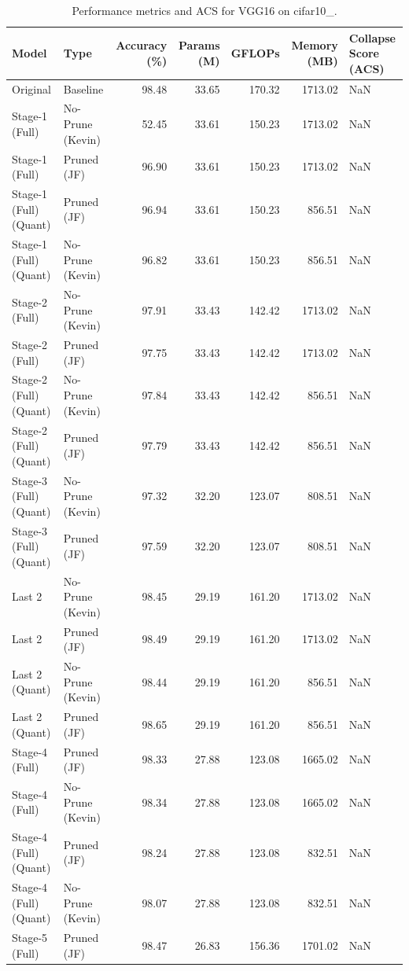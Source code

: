 \begin{table}
\caption{Performance metrics and ACS for VGG16 on cifar10_.}
\label{tab:VGG16_cifar10_}
\begin{tabular}{llrrrrl}
\toprule
Model & Type & Accuracy (\%) & Params (M) & GFLOPs & Memory (MB) & Collapse Score (ACS) \\
\midrule
Original & Baseline & 98.48 & 33.65 & 170.32 & 1713.02 & NaN \\
Stage-1 (Full) & No-Prune (Kevin) & 52.45 & 33.61 & 150.23 & 1713.02 & NaN \\
Stage-1 (Full) & Pruned (JF) & 96.90 & 33.61 & 150.23 & 1713.02 & NaN \\
Stage-1 (Full)
(Quant) & Pruned (JF) & 96.94 & 33.61 & 150.23 & 856.51 & NaN \\
Stage-1 (Full)
(Quant) & No-Prune (Kevin) & 96.82 & 33.61 & 150.23 & 856.51 & NaN \\
Stage-2 (Full) & No-Prune (Kevin) & 97.91 & 33.43 & 142.42 & 1713.02 & NaN \\
Stage-2 (Full) & Pruned (JF) & 97.75 & 33.43 & 142.42 & 1713.02 & NaN \\
Stage-2 (Full)
(Quant) & No-Prune (Kevin) & 97.84 & 33.43 & 142.42 & 856.51 & NaN \\
Stage-2 (Full)
(Quant) & Pruned (JF) & 97.79 & 33.43 & 142.42 & 856.51 & NaN \\
Stage-3 (Full)
(Quant) & No-Prune (Kevin) & 97.32 & 32.20 & 123.07 & 808.51 & NaN \\
Stage-3 (Full)
(Quant) & Pruned (JF) & 97.59 & 32.20 & 123.07 & 808.51 & NaN \\
Last 2 & No-Prune (Kevin) & 98.45 & 29.19 & 161.20 & 1713.02 & NaN \\
Last 2 & Pruned (JF) & 98.49 & 29.19 & 161.20 & 1713.02 & NaN \\
Last 2
(Quant) & No-Prune (Kevin) & 98.44 & 29.19 & 161.20 & 856.51 & NaN \\
Last 2
(Quant) & Pruned (JF) & 98.65 & 29.19 & 161.20 & 856.51 & NaN \\
Stage-4 (Full) & Pruned (JF) & 98.33 & 27.88 & 123.08 & 1665.02 & NaN \\
Stage-4 (Full) & No-Prune (Kevin) & 98.34 & 27.88 & 123.08 & 1665.02 & NaN \\
Stage-4 (Full)
(Quant) & Pruned (JF) & 98.24 & 27.88 & 123.08 & 832.51 & NaN \\
Stage-4 (Full)
(Quant) & No-Prune (Kevin) & 98.07 & 27.88 & 123.08 & 832.51 & NaN \\
Stage-5 (Full) & Pruned (JF) & 98.47 & 26.83 & 156.36 & 1701.02 & NaN \\

\end{tabular}
\end{table}
